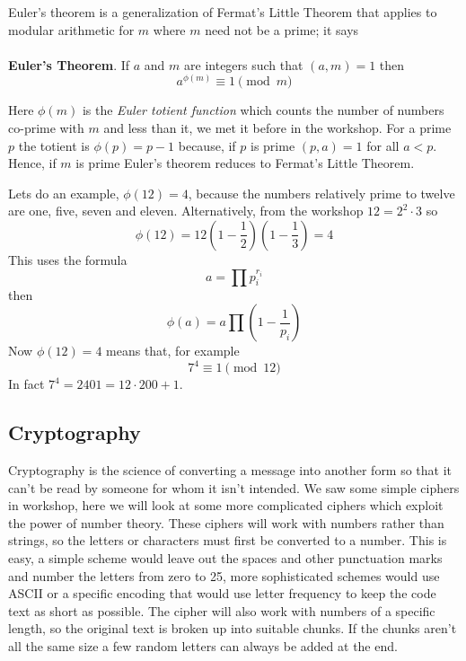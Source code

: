 \documentclass[12pt]{article}
\begin{document}
Euler's theorem is a generalization of Fermat's Little Theorem that applies to modular arithmetic for $m$ where $m$ need not be a prime; it says\\
\\
\textbf{Euler's Theorem}. If $a$ and $m$ are integers such that $(a,m)=1$ then 
\begin{equation}
a^{\phi(m)}\equiv 1 \pmod m
\end{equation}

Here $\phi(m)$ is the \textsl{Euler totient function} which counts the
number of numbers co-prime with $m$ and less than it, we met it before
in the workshop. For a prime $p$ the totient is $\phi(p)=p-1$ because,
if $p$ is prime $(p,a)=1$ for all $a<p$. Hence, if $m$ is prime
Euler's theorem reduces to Fermat's Little Theorem.

Lets do an example, $\phi(12)=4$, because the numbers relatively prime to twelve are one, five, seven and eleven. Alternatively, from the workshop $12=2^2\cdot 3$ so
\begin{equation}
\phi(12)=12\left(1-\frac{1}{2}\right)\left(1-\frac{1}{3}\right)=4
\end{equation}
This uses the formula
\begin{equation}
a=\prod p_i^{r_i}
\end{equation}
then
\begin{equation}
\phi(a)=a\prod\left(1-\frac{1}{p_i}\right)
\end{equation}
Now $\phi(12)=4$ means that, for example
\begin{equation}
7^4\equiv 1 \pmod{12}
\end{equation}
In fact $7^4=2401=12\cdot 200 +1$. 

\subsection*{Cryptography}

Cryptography is the science of converting a message into another form
so that it can't be read by someone for whom it isn't intended. We saw
some simple ciphers in workshop, here we will look at some more
complicated ciphers which exploit the power of number theory. These
ciphers will work with numbers rather than strings, so the letters or
characters must first be converted to a number. This is easy, a simple
scheme would leave out the spaces and other punctuation marks and
number the letters from zero to 25, more sophisticated schemes would
use ASCII or a specific encoding that would use letter frequency to
keep the code text as short as possible. The cipher will also work
with numbers of a specific length, so the original text is broken up
into suitable chunks. If the chunks aren't all the same size a few random letters can always be added at the end.
\end{document}
